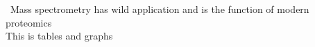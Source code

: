 \ Mass spectrometry has wild application and is the function of modern proteomics 
\\
This is tables and graphs
